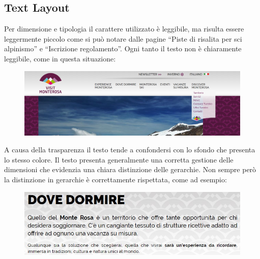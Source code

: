         \subsection{Text Layout}
        Per dimensione e tipologia il carattere utilizzato è leggibile, ma
        risulta essere leggermente piccolo come si può notare  dalle pagine
        “Piste di risalita per sci alpinismo” e “Iscrizione regolamento”.
        Ogni tanto il testo non è chiaramente leggibile, come in questa
        situazione:
        \begin{figure}[H]
            \includegraphics[scale=0.15]{resources/images/textLayout2.png}
        \end{figure}
        A causa della trasparenza il testo tende a confondersi con lo sfondo che
        presenta lo stesso colore. Il testo presenta generalmente una corretta gestione delle
        dimensioni che evidenzia una chiara distinzione delle gerarchie.
        Non sempre però la distinzione in gerarchie è correttamente rispettata, come ad esempio:
        \begin{figure}[H]
            \includegraphics[scale=0.6]{resources/images/textLayout4.jpg}
        \end{figure}
